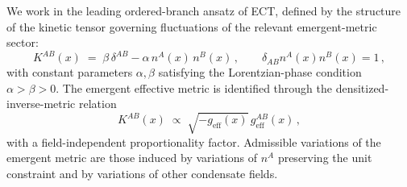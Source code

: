 We work in the leading ordered-branch ansatz of ECT, defined by the
structure of the kinetic tensor governing fluctuations of the relevant
emergent-metric sector:
\begin{equation}
K^{AB}(x) \;=\; \beta\,\delta^{AB} - \alpha\, n^A(x)\, n^B(x)\,,
\qquad \delta_{AB} n^A(x) n^B(x) = 1\,,
\label{eq:KAB_cc}
\end{equation}
with constant parameters $\alpha,\beta$ satisfying the Lorentzian-phase
condition $\alpha > \beta > 0$. The emergent effective metric is
identified through the densitized-inverse-metric relation
\begin{equation}
K^{AB}(x) \;\propto\; \sqrt{-g_{\mathrm{eff}}(x)}\,
g_{\mathrm{eff}}^{AB}(x)\,,
\label{eq:K_geff_identification}
\end{equation}
with a field-independent proportionality factor. Admissible variations
of the emergent metric are those induced by variations of $n^A$
preserving the unit constraint and by variations of other condensate
fields.

